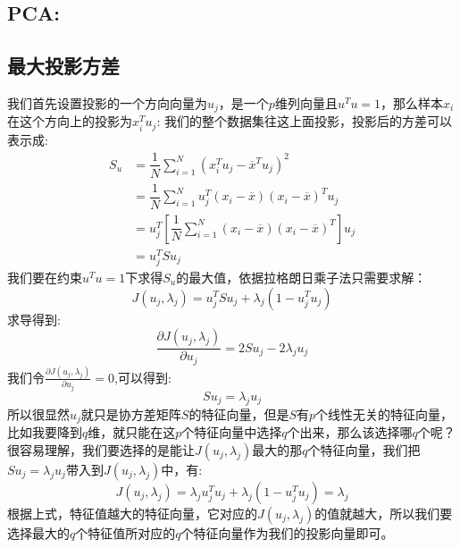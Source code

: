 \documentclass[withoutpreface,bwprint]{cumcmthesis} %
\begin{document}
	\subsection{\LARGE PCA:}
	\subsection{\Large 最大投影方差}
	我们首先设置投影的一个方向向量为$u_j$，是一个$p$维列向量且$u^Tu=1$，那么样本$x_i$在这个方向上的投影为$x_i^Tu_j$:
	我们的整个数据集往这上面投影，投影后的方差可以表示成:
	\begin{align*}
		S_u
		&=\dfrac{1}{N}\sum_{i=1}^{N}(x_i^Tu_j-\overline{x}^Tu_j)^2\\
		&=\dfrac{1}{N}\sum_{i=1}^{N}u_j^T(x_i-\overline{x})(x_i-\overline{x})^Tu_j\\
		&=u_j^T  \left[\dfrac{1}{N}\sum_{i=1}^{N}(x_i-\overline{x})(x_i-\overline{x})^T\right] u_j \\
		&=u_j^TSu_j 		
	\end{align*}
	我们要在约束$u^Tu=1$下求得$S_u$的最大值，依据拉格朗日乘子法只需要求解：
	\begin{equation}
		J(u_j,\lambda_j)=u_j^TSu_j+\lambda_j (1-u_j^Tu_j)
	\end{equation}
	求导得到:
	\begin{equation}
		\frac{\partial J(u_j,\lambda_j)}{\partial u_j}=2Su_j-2\lambda_j u_j
	\end{equation}
	我们令$\frac{\partial J(u_j,\lambda_j)}{\partial u_j}=0$,可以得到:
	\begin{equation}
		Su_j=\lambda_j u_j
	\end{equation}
	所以很显然$u_j$就只是协方差矩阵$S$的特征向量，但是$S$有$p$个线性无关的特征向量，比如我要降到$q$维，就只能在这$p$个特征向量中选择$q$个出来，那么该选择哪$q$个呢？\\
	很容易理解，我们要选择的是能让$J(u_j,\lambda_j)$最大的那$q$个特征向量，我们把$Su_j=\lambda_j u_j$带入到$J(u_j,\lambda_j)$中，有:
	\begin{equation}
		J(u_j,\lambda_j)=\lambda_j u_j^Tu_j+\lambda_j (1-u_j^Tu_j)=\lambda_j
	\end{equation}
	根据上式，特征值越大的特征向量，它对应的$J(u_j,\lambda_j)$的值就越大，所以我们要选择最大的$q$个特征值所对应的$q$个特征向量作为我们的投影向量即可。
\end{document}
